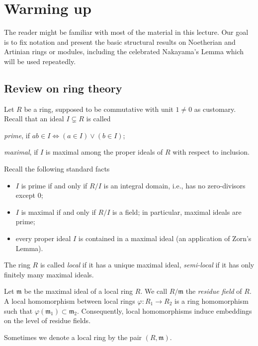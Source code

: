 
\chapter{Warming up}

The reader might be familiar with most of the material in this lecture. Our goal is to fix notation and present the basic structural results on Noetherian and Artinian rings or modules, including the celebrated Nakayama's Lemma which will be used repeatedly.

\section{Review on ring theory}
Let $R$ be a ring, supposed to be commutative with unit $1 \neq 0$ as customary. Recall that an ideal $I \subsetneq R$ is called
\begin{compactitem}
	\item \emph{prime}, if $ab \in I \iff (a \in I) \vee (b \in I)$;
	\item \emph{maximal}, if $I$ is maximal among the proper ideals of $R$ with respect to inclusion.
\end{compactitem}
Recall the following standard facts
\begin{itemize}
	\item $I$ is prime if and only if $R/I$ is an integral domain, i.e., has no zero-divisors except $0$;
	\item $I$ is maximal if and only if $R/I$ is a field; in particular, maximal ideals are prime;
	\item every proper ideal $I$ is contained in a maximal ideal (an application of Zorn's Lemma).
\end{itemize}

\begin{definition} 
	The ring $R$ is called \emph{local} if it has a unique maximal ideal, \emph{semi-local} if it has only finitely many maximal ideals.
	
	Let $\mathfrak{m}$ be the maximal ideal of a local ring $R$. We call $R/\mathfrak{m}$ the \emph{residue field} of $R$. A local homomorphism between local rings $\varphi: R_1 \to R_2$ is a ring homomorphism such that $\varphi(\mathfrak{m}_1) \subset \mathfrak{m}_2$. Consequently, local homomorphisms induce embeddings on the level of residue fields.
\end{definition}
Sometimes we denote a local ring by the pair $(R, \mathfrak{m})$.

